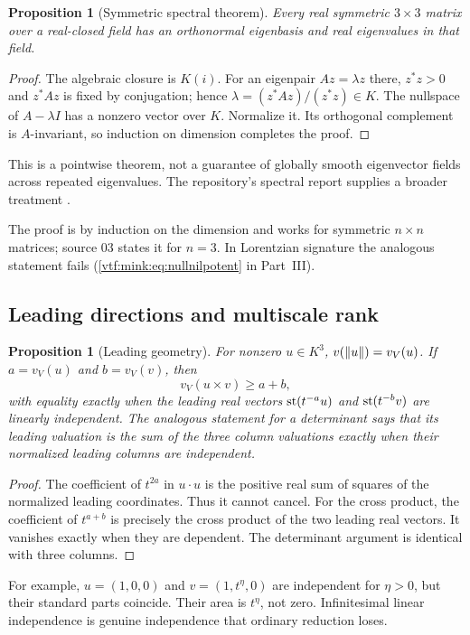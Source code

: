 \documentclass[11pt,letterpaper]{article}
\newtheorem{proposition}[theorem]{Proposition}
\theoremstyle{definition}
\theoremstyle{remark}
\begin{document}
\begin{proposition}[Symmetric spectral theorem]
Every real symmetric $3\times3$ matrix over a real-closed field has an orthonormal eigenbasis and real eigenvalues in that field.
\end{proposition}
\begin{proof}
The algebraic closure is $K(i)$. For an eigenpair $Az=\lambda z$ there, $z^*z>0$ and $z^*Az$ is fixed by conjugation; hence $\lambda=(z^*Az)/(z^*z)\in K$. The nullspace of $A-\lambda I$ has a nonzero vector over $K$. Normalize it. Its orthogonal complement is $A$-invariant, so induction on dimension completes the proof.
\end{proof}
This is a pointwise theorem, not a guarantee of globally smooth eigenvector fields across repeated eigenvalues. The repository's spectral report supplies a broader treatment \cite{RepoSpectral}.

The proof is by induction on the dimension and works for symmetric $n\times n$
matrices; source 03 states it for $n=3$. In Lorentzian signature the analogous
statement fails (\eqref{vtf:mink:eq:nullnilpotent} in Part~III).

\subsection{Leading directions and multiscale rank}
\begin{proposition}[Leading geometry]\label{vtf:3d:prop:leading}
For nonzero $u\in K^3$, $v(\lVert u\rVert)=v_V(u)$. If $a=v_V(u)$ and $b=v_V(v)$, then
\[
 v_V(u\times v)\geq a+b,
\]
with equality exactly when the leading real vectors
$\operatorname{st}(t^{-a}u)$ and $\operatorname{st}(t^{-b}v)$ are linearly independent. The analogous statement for a determinant says that its leading valuation is the sum of the three column valuations exactly when their normalized leading columns are independent.
\end{proposition}
\begin{proof}
The coefficient of $t^{2a}$ in $u\cdot u$ is the positive real sum of squares of the normalized leading coordinates. Thus it cannot cancel. For the cross product, the coefficient of $t^{a+b}$ is precisely the cross product of the two leading real vectors. It vanishes exactly when they are dependent. The determinant argument is identical with three columns.
\end{proof}
For example, $u=(1,0,0)$ and $v=(1,t^\eta,0)$ are independent for $\eta>0$, but their standard parts coincide. Their area is $t^\eta$, not zero. Infinitesimal linear independence is genuine independence that ordinary reduction loses.
\end{document}
